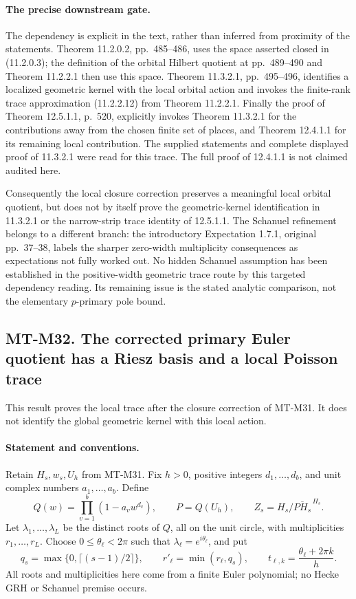 \paragraph{The precise downstream gate.}
The dependency is explicit in the text, rather than inferred
from proximity of the statements.  Theorem 11.2.0.2,
pp.~485--486, uses the space asserted closed in
(11.2.0.3); the definition of the orbital Hilbert quotient
at pp.~489--490 and Theorem 11.2.2.1 then use this space.
Theorem 11.3.2.1, pp.~495--496, identifies a localized
geometric kernel with the local orbital action and invokes
the finite-rank trace approximation (11.2.2.12) from
Theorem 11.2.2.1.  Finally the proof of Theorem 12.5.1.1,
p.~520, explicitly invokes Theorem 11.3.2.1 for the
contributions away from the chosen finite set of places,
and Theorem 12.4.1.1 for its remaining local contribution.
The supplied statements and complete displayed proof of
11.3.2.1 were read for this trace.  The full proof of
12.4.1.1 is not claimed audited here.

Consequently the local closure correction preserves a
meaningful local orbital quotient, but does not by itself
prove the geometric-kernel identification in 11.3.2.1
or the narrow-strip trace identity of 12.5.1.1.
The Schanuel refinement belongs to a different branch:
the introductory Expectation 1.7.1, original pp.~37--38,
labels the sharper zero-width multiplicity consequences
as expectations not fully worked out.  No hidden Schanuel
assumption has been established in the positive-width
geometric trace route by this targeted dependency reading.
Its remaining issue is the stated analytic comparison,
not the elementary $p$-primary pole bound.

\subsection*{MT-M32. The corrected primary Euler quotient has a Riesz basis
and a local Poisson trace}

This result proves the local trace after the closure correction
of MT-M31.  It does not identify the global geometric kernel
with this local action.

\paragraph{Statement and conventions.}
Retain $H_s,w_s,U_h$ from MT-M31.  Fix $h>0$, positive
integers $d_1,\ldots,d_b$, and unit complex numbers
$a_1,\ldots,a_b$.  Define
\[
 Q(w)=\prod_{v=1}^{b}(1-a_vw^{d_v}),\qquad
 P=Q(U_h),\qquad
 Z_s=H_s/\overline{PH_s}^{\,H_s}.
 \tag{M32.1}
\]
Let $\lambda_1,\ldots,\lambda_L$ be the distinct roots
of $Q$, all on the unit circle, with multiplicities
$r_1,\ldots,r_L$.  Choose $0\leq\theta_\ell<2\pi$
such that $\lambda_\ell=e^{i\theta_\ell}$, and put
\[
 q_s=\max\{0,\lceil(s-1)/2\rceil\},\qquad
 r'_\ell=\min(r_\ell,q_s),\qquad
 t_{\ell,k}=\frac{\theta_\ell+2\pi k}{h}.
 \tag{M32.2}
\]
All roots and multiplicities here come from a finite Euler
polynomial; no Hecke GRH or Schanuel premise occurs.

